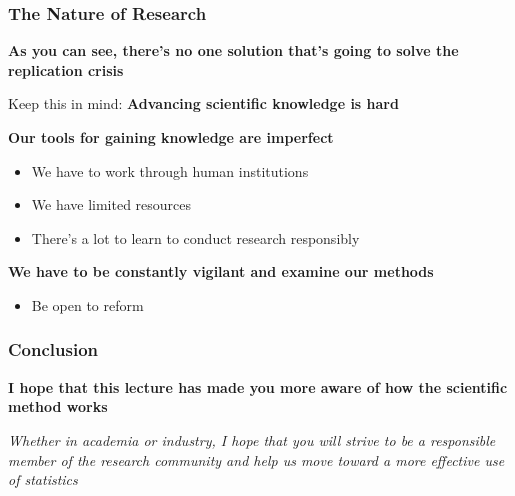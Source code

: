 \documentclass[10pt, block=fill]{beamer}
\begin{document}
\begin{frame}
    \frametitle{The Nature of Research}
    
    \textbf{As you can see, there's no one solution that's going to solve the replication crisis}
    
    \vspace{0.2in}
    
    \begin{block}{Keep this in mind:}
        \textbf{Advancing scientific knowledge is hard}
    \end{block}
    
    \vspace{0.2in}
    
    \textbf{Our tools for gaining knowledge are imperfect}
    \begin{itemize}
        \item We have to work through human institutions
        \item We have limited resources
        \item There's a lot to learn to conduct research responsibly
    \end{itemize}
    
    \vspace{0.2in}
    
    \textbf{We have to be constantly vigilant and examine our methods}
    \begin{itemize}
        \item Be open to reform
    \end{itemize}
\end{frame}

\begin{frame}
    \frametitle{Conclusion}
    
    {\large 
        \textbf{I hope that this lecture has made you more aware of how the scientific method works}
        
        \vspace{0.25in}
    
        \textit{Whether in academia or industry, I hope that you will strive to be a responsible member of the research community and help us move toward a more effective use of statistics}
    }
\end{frame}
\end{document}
